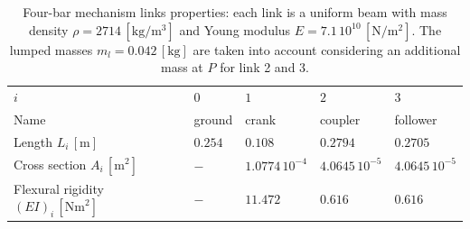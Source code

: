 \documentclass{svjour3}                     %
\begin{document}
\begin{table}[bt]
	\caption{Four-bar mechanism links properties: each link is a uniform beam with mass density $\rho=2714\,[\mathrm{kg}/\mathrm{m}^3]$ and Young modulus $E=7.1\,10^{10}\,[\mathrm{N}/\mathrm{m}^2]$. The lumped masses $m_l=0.042\,[\mathrm{kg}]$ are taken into account considering an additional mass at $P$ for link 2 and 3.}
	\label{tab:data_4bars}       %
	\begin{tabular}{lllll}
		\hline\noalign{\smallskip}
		$i$ & $0$ &  $1$ &  $2$ &  $3$  \\
		\noalign{\smallskip}\hline\noalign{\smallskip}
		Name & ground & crank & coupler & follower \\ 
		Length $L_i\,[\mathrm{m}]$ & $0.254$ & $0.108$ & $0.2794$ & $0.2705$\\
		Cross section $A_i\,[\mathrm{m}^2]$ & $-$ & $1.0774\,10^{-4}$ & $4.0645\,10^{-5}$ & $4.0645\,10^{-5}$ \\
		Flexural rigidity $(EI)_i\,[\mathrm{Nm}^2]$ & $-$ & $11.472$ & $0.616$ & $0.616$ \\
		\hline
	\end{tabular}
\end{table}
\end{document}
